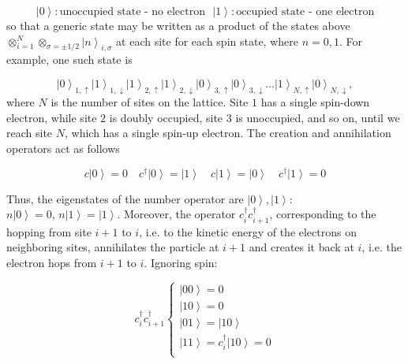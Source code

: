 \begin{equation}
\left| 0 \right\rangle : \text{unoccupied state - no electron} \,\,\,\, \left| 1 \right\rangle : \text{occupied state - one electron}
\end{equation}
so that a generic state may be written as a product of the states above $\otimes_{i=1}^{N} \otimes_{\sigma = \pm 1/2} \left| n \right\rangle_{i, \sigma}$ at each site for each spin state, where $n= 0, 1$.
For example, one such state is

\begin{equation}
\left| 0 \right\rangle_{1, \uparrow} \left| 1 \right\rangle_{1, \downarrow} \left| 1 \right\rangle_{2, \uparrow} \left| 1 \right\rangle_{2, \downarrow} \left| 0 \right\rangle_{3, \uparrow} \left| 0 \right\rangle_{3, \downarrow} ... \left| 1 \right\rangle_{N, \uparrow} \left| 0 \right\rangle_{N, \downarrow}  ,
\end{equation}
where $N$ is the number of sites on the lattice. Site $1$ has a single spin-down electron, while site $2$ is doubly occupied, site $3$ is unoccupied, and so on, until we reach site $N$, which has a single spin-up electron.
The creation and annihilation operators act as follows

\begin{equation}
c \left| 0 \right\rangle = 0 \quad c^\dagger \left| 0 \right\rangle = \left| 1 \right\rangle \quad c \left| 1 \right\rangle = \left| 0 \right\rangle \quad c^\dagger \left| 1 \right\rangle = 0
\end{equation}

Thus, the eigenstates of the number operator are $\left| 0 \right\rangle, \left| 1 \right\rangle$: $
n \left| 0 \right\rangle = 0 , \, n \left| 1 \right\rangle = \left| 1 \right\rangle
$.
Moreover, the operator $c_i^\dagger c_{i+1}^\dagger$, corresponding to the hopping from site $i+1$ to $i$, i.e. to the kinetic energy of the electrons on neighboring sites, annihilates the particle at $i+1$ and creates it back at $i$, i.e. the electron hops from $i+1$ to $i$.
Ignoring spin:

\begin{equation}
c_i^\dagger c_{i+1}^\dagger \begin{cases}
\left|0 0 \right\rangle = 0 \\
\left|1 0 \right\rangle =  0 \\
\left|0 1 \right\rangle =  \left| 1 0 \right\rangle \\
\left|1 1 \right\rangle =  c_i^\dagger \left| 1 0  \right\rangle = 0 \\
\end{cases}
\end{equation}

